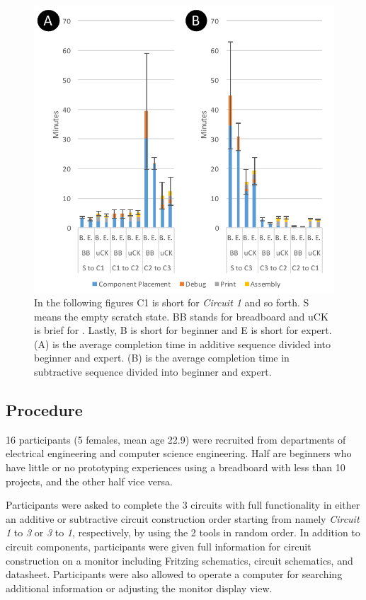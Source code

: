 \begin{figure}[h]
  \begin{center}
  \includegraphics[width=1\columnwidth]{figures/Circuit_Construction_Duration_v15.pdf}
  \caption{In the following figures C1 is short for \textit{Circuit 1} and so forth. S means the empty scratch state. BB stands for breadboard and uCK is brief for \papertitle. Lastly, B is short for beginner and E is short for expert. (A) is the average completion time in additive sequence divided into beginner and expert. (B) is the average completion time in subtractive sequence divided into beginner and expert.}
  \label{fig:Circuit_Construction_Duration}
  \end{center}
\end{figure}

\subsection{Procedure}

16 participants (5 females, mean age 22.9) were recruited from departments of electrical engineering and computer science engineering. Half are beginners who have little or no prototyping experiences using a breadboard with less than 10 projects, and the other half vice versa.

Participants were asked to complete the 3 circuits with full functionality in either an additive or subtractive circuit construction order starting from namely \textit{Circuit 1} to \textit{3} or \textit{3} to \textit{1}, respectively, by using the 2 tools in random order. In addition to circuit components, participants were given full information for circuit construction on a monitor including Fritzing schematics, circuit schematics, and datasheet. Participants were also allowed to operate a computer for searching additional information or adjusting the monitor display view.

